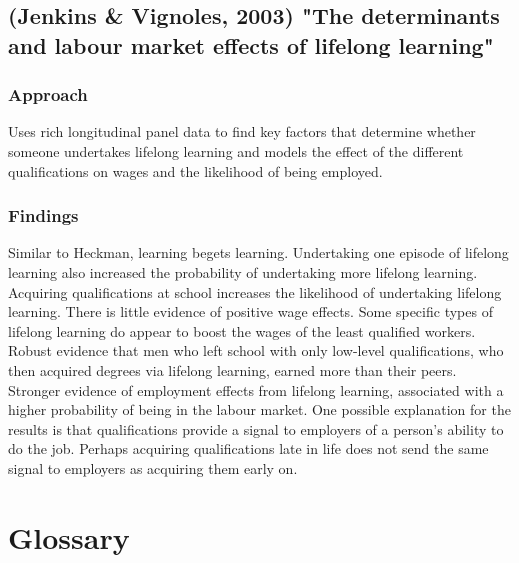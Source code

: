 \documentclass[12pt,a4paper]{article}
\begin{document}
    \subsection{(Jenkins \& Vignoles, 2003) "The determinants and labour market effects of lifelong learning"}
      \subsubsection{Approach}
      Uses rich longitudinal panel data to find key factors that determine whether someone undertakes lifelong learning and models the effect of the different qualifications on wages and the likelihood of being employed.

      \subsubsection{Findings}
      Similar to Heckman, learning begets learning. Undertaking one episode of lifelong learning also increased the probability of undertaking more lifelong learning. Acquiring qualifications at school increases the likelihood of undertaking lifelong learning. There is little evidence of positive wage effects. Some specific types of lifelong learning do appear to boost the wages of the least qualified workers. Robust evidence that men who left school with only low-level qualifications, who then acquired degrees via lifelong learning, earned more than their peers. Stronger evidence of employment effects from lifelong learning, associated with a higher probability of being in the labour market. One possible explanation for the results is that qualifications provide a signal to employers of a person’s ability to do the job. Perhaps acquiring qualifications late in life does not send the same signal to employers as acquiring them early on.


  \appendix
\section{Glossary} %
  \label{sec:Glossary}
\end{document}
